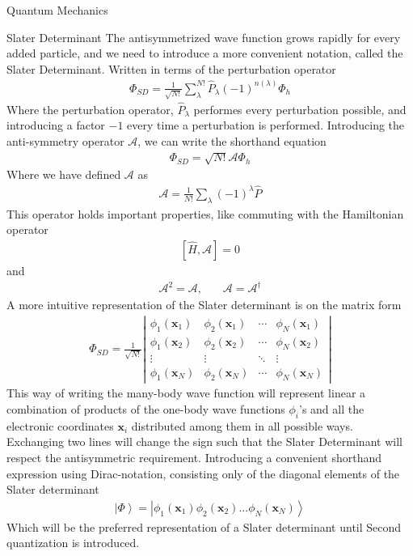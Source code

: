 \documentclass[twoside,english]{uiofysmaster}
\begin{document}
\begin{chapter}{Quantum Mechanics}
	\begin{section}{Slater Determinant}
		The antisymmetrized wave function grows rapidly for every added particle, and we need to introduce a more convenient notation, called the Slater Determinant. Written in terms of the perturbation operator \cite{Audun}
		\begin{align}
			\Phi_{SD} = \frac{1}{\sqrt{N!}} \sum_\lambda^{N!} \hat P_\lambda (-1)^{n(\lambda)} \Phi_h		 	
		\end{align} 
		Where the perturbation operator, $\hat P_{\lambda}$ performes every perturbation possible, and introducing a factor $-1$ every time a perturbation is performed. Introducing the anti-symmetry operator $\mathcal{A}$, we can write the shorthand equation
		\begin{align}
			\Phi_{SD} = \sqrt{N!}\mathcal{A}\Phi_h
			\label{equation:SlaterDeterminant}
		\end{align}
		Where we have defined $\mathcal{A}$ as \cite{MHJSlides}
		\begin{align}
			\mathcal{A} = \frac{1}{N!} \sum_\lambda (-1)^\lambda \hat P
		\end{align}
		This operator holds important properties, like commuting with the Hamiltonian operator
		\begin{align}
			\left[\hat H, \mathcal{A}\right] = 0
		\end{align}
		and 
		\begin{align}
			\mathcal{A}^2 = \mathcal{A}, \:\:\:\:\:\:\:\: \mathcal{A} = \mathcal{A}^\dagger
			\label{equation:OperatorA}
		\end{align}
		A more intuitive representation of the Slater determinant is on the matrix form 
		\begin{align}
			\Phi_{SD} = \frac{1}{ \sqrt{N!} } \left|\begin{matrix}
				\phi_1(\mathbf{x}_1) & \phi_2(\mathbf{x}_1) & \cdots & \phi_N(\mathbf{x}_1) \\
				\phi_1(\mathbf{x}_2) & \phi_2(\mathbf{x}_2) & \cdots & \phi_N(\mathbf{x}_2) \\
				\vdots & \vdots & \ddots & \vdots \\
				\phi_1(\mathbf{x}_N) & \phi_2(\mathbf{x}_N) & \cdots & \phi_N(\mathbf{x}_N) 
			\end{matrix} \right|
		\end{align}
		This way of writing the many-body wave function will represent linear a combination of products of the one-body wave functions $\phi_i$'s and all the electronic coordinates $\mathbf{x}_i$ distributed among them in all possible ways. Exchanging two lines will change the sign such that the Slater Determinant will respect the antisymmetric requirement. Introducing a convenient shorthand expression using Dirac-notation, consisting only of the diagonal elements of the Slater determinant \cite{Crawford}
		\begin{align}
			\left| \Phi \right > = \left| \phi_1(\mathbf{x}_1) \phi_2(\mathbf{x}_2) ... \phi_N({\mathbf{x}_N}) \right>  
		\end{align}
		Which will be the preferred representation of a Slater determinant until Second quantization is introduced. 
	\end{section}


\end{chapter}
\end{document}
